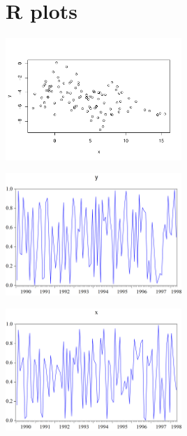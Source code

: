 \documentclass[
]{article}
\begin{document}
\hypertarget{r-plots}{%
\section{R plots}\label{r-plots}}

\begin{center}\includegraphics[width=0.5\textwidth]{test_engEviews_files/figure-latex/label-1} \end{center}

\begin{center}\includegraphics[width=0.5\textwidth]{EViewsR_files/eview-graph-y} \end{center}

\begin{center}\includegraphics[width=0.5\textwidth]{EViewsR_files/eview-graph-x} \end{center}
\end{document}
